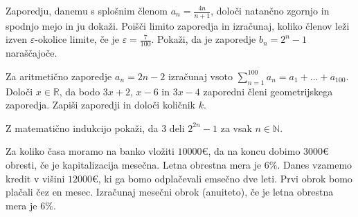\documentclass{izpit}
\begin{document}
\naloga[\tocke{9}]
  \podnaloga[4]
  Zaporedju, danemu s splošnim členom $a_n=\frac{4n}{n+1}$, določi natančno zgornjo in spodnjo mejo in ju dokaži.
  \prostor[1]
  \podnaloga[3]
  Poišči limito zaporedja in izračunaj, koliko členov leži izven $\varepsilon$-okolice limite, če je $\varepsilon=\frac{7}{100}$.
  \prostor[1]
  \naloga*[3]
  Pokaži, da je zaporedje $b_n=2^n-1$ naraščajoče.
  \prostor[1]

  
\naloga[\tocke{8}]
  \podnaloga[3]
  Za aritmetično zaporedje $a_n=2n-2$ izračunaj vsoto $\sum_{n=1}^{100} a_n =a_1 +\ldots +a_{100}$.
  \prostor[1]
  \podnaloga[5]
  Določi $x\in\mathbb{R}$, da bodo $3x+2$, $x-6$ in $3x-4$ zaporedni členi geometrijskega zaporedja. Zapiši zaporedji in določi količnik $k$.
  \prostor[1]


\naloga[\tocke{5}]
  \podnaloga[5]
  Z matematično indukcijo pokaži, da $3$ deli $2^{2n}-1$ za vsak $n\in \mathbb{N}$.


\naloga[\tocke{8}]
  \podnaloga[4]
  Za koliko časa moramo na banko vložiti $10000\euro{}$, da na koncu dobimo $3000\euro{}$ obresti, če je kapitalizacija mesečna. Letna obrestna mera je $6\%$.
  \prostor[1]
  \podnaloga[4]
  Danes vzamemo kredit v višini $12000\euro{}$, ki ga bomo odplačevali emsečno dve leti. Prvi obrok bomo plačali čez en mesec. Izračunaj mesečni obrok (anuiteto), če je letna obrestna mera je $6\%$.
  \prostor[1]
\end{document}
